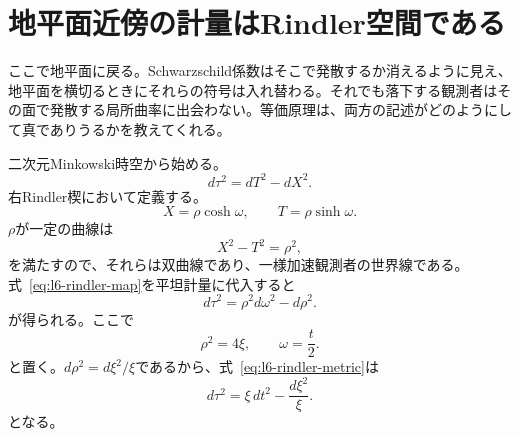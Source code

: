 \begin{classroomqa}
\end{classroomqa}

\section{地平面近傍の計量はRindler空間である}

ここで地平面に戻る。Schwarzschild係数はそこで発散するか消えるように見え、地平面を横切るときにそれらの符号は入れ替わる。それでも落下する観測者はその面で発散する局所曲率に出会わない。等価原理は、両方の記述がどのようにして真でありうるかを教えてくれる。

二次元Minkowski時空から始める。
\begin{equation}
d\tau^{2}=dT^{2}-dX^{2}.
\end{equation}
右Rindler楔において定義する。
\begin{equation}
X=\rho\cosh\omega,
\qquad
T=\rho\sinh\omega.
\label{eq:l6-rindler-map}
\end{equation}
\(\rho\)が一定の曲線は
\begin{equation}
X^{2}-T^{2}=\rho^{2},
\end{equation}
を満たすので、それらは双曲線であり、一様加速観測者の世界線である。式~\eqref{eq:l6-rindler-map}を平坦計量に代入すると
\begin{equation}
d\tau^{2}
=\rho^{2}d\omega^{2}-d\rho^{2}.
\label{eq:l6-rindler-metric}
\end{equation}
が得られる。ここで
\begin{equation}
\rho^{2}=4\xi,
\qquad
\omega=\frac{t}{2}.
\label{eq:l6-rindler-rescale}
\end{equation}
と置く。\(d\rho^{2}=d\xi^{2}/\xi\)であるから、式~\eqref{eq:l6-rindler-metric}は
\begin{equation}
d\tau^{2}
=\xi\,dt^{2}-\frac{d\xi^{2}}{\xi}.
\label{eq:l6-xi-metric}
\end{equation}
となる。

\begin{classroomqa}
\end{classroomqa}

